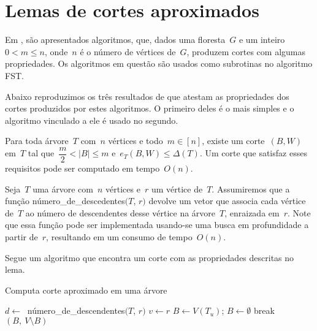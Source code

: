 \section {Lemas de cortes aproximados}

Em \cite{Schmidt15}, são apresentados 
algoritmos, que, dados uma floresta~$G$ e um 
inteiro~${0<m\le n}$, onde~$n$ é o número de vértices de~$G$, 
produzem cortes com algumas propriedades.
Os algoritmos em questão são usados como subrotinas no algoritmo
FST.

Abaixo reproduzimos os três resultados de \cite{Schmidt15} que 
atestam as propriedades dos cortes produzidos por estes algoritmos.
O primeiro deles é o mais simples e o algoritmo vinculado a ele
é usado no segundo.

\bigskip

\begin{lem}[]
\label{lema:simpleApproxCutTree}
	Para toda árvore~$T$ com~$n$ vértices e todo~${m \in [n]}$,
	existe um corte~$(B,W)$ em~$T$ tal 
	que~${\dfrac{m}{2} <|B| \le m}$ e~${e_T(B,W) \le \Delta(T)}$.
	Um corte que satisfaz esses requisitos pode ser computado em
	tempo~$O(n)$.
\end{lem}

\bigskip

Seja~$T$ uma árvore com~$n$ vértices e~$r$ um vértice de~$T$. 
Assumiremos que
a função {\sc número\_de\_descedentes}$(T$, $r)$ devolve um vetor
que associa cada vértice de~$T$ ao número de descendentes desse 
vértice na árvore~$T$, enraizada em~$r$. 
Note que essa função 
pode ser implementada usando-se uma busca em profundidade
a partir de~$r$,
resultando em um consumo de tempo~$O(n)$.


Segue um algoritmo que encontra um corte com as propriedades 
descritas no lema.

\bigskip

\begin{algorithm}[H]
\label{alg:simpleApproxCutTree}

	\caption{Computa corte aproximado em uma árvore}
		$d \gets~$ {\sc número\_de\_descendentes}$(T$, $r)$\;
		$v \gets r$\;
		{
			$B\gets V(T_u)$; \quad
		}
		{
		$B \gets \emptyset$\;
		{
			{
				break\;
			}
		}
		}
	\Return $(B,\ V\setminus B)$

\end{algorithm}	

